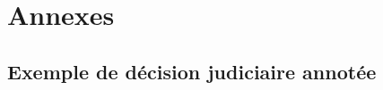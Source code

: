 \appendix
\renewcommand{\thesection}{A.\roman{section}}
\renewcommand{\thefigure}{A.\arabic{figure}}
\renewcommand{\thetable}{A.\arabic{table}}
\chapter*{Annexes}
\section{Exemple de d\'ecision judiciaire annot\'ee}
\label{appendix:exemple-decision}
\lstset{language=XMl}
